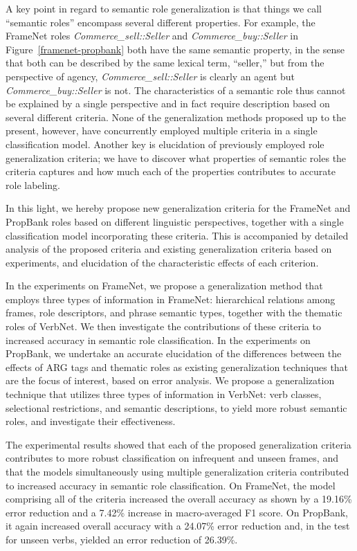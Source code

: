 \documentclass[english]{jnlp_1.4_rep}
\begin{document}
A key point in regard to semantic role generalization is that things we call ``semantic roles'' encompass several different properties. For example, the FrameNet roles {\it Commerce\_sell::Seller} and {\it Commerce\_buy::Seller} in Figure~\ref{framenet-propbank} both have the same semantic property, in the sense that both can be described by the same lexical term, ``seller,'' but from the perspective of agency, {\it Commerce\_sell::Seller} is clearly an agent but {\it Commerce\_buy::Seller} is not. The characteristics of a semantic role thus cannot be explained by a single perspective and in fact require description based on several different criteria. None of the generalization methods proposed up to the present, however, have concurrently employed multiple criteria in a single classification model. Another key is elucidation of previously employed role generalization criteria; we have to discover what properties of semantic roles the criteria captures and how much each of the properties contributes to accurate role labeling.

In this light, we hereby propose new generalization criteria for the FrameNet and PropBank roles based on different linguistic perspectives, together with a single classification model incorporating these criteria. This is accompanied by detailed analysis of the proposed criteria and existing generalization criteria based on experiments, and elucidation of the characteristic effects of each criterion.

In the experiments on FrameNet, we propose a generalization method that employs three types of information in FrameNet: hierarchical relations among frames, role descriptors, and phrase semantic types, together with the thematic roles of VerbNet. We then investigate the contributions of these criteria to increased accuracy in semantic role classification. In the experiments on PropBank, we undertake an accurate elucidation of the differences between the effects of ARG tags and thematic roles as existing generalization techniques that are the focus of interest, based on error analysis. We propose a generalization technique that utilizes three types of information in VerbNet: verb classes, selectional restrictions, and semantic descriptions, to yield more robust semantic roles, and investigate their effectiveness.

The experimental results showed that each of the proposed generalization criteria contributes to more robust classification on infrequent and unseen frames, and that the models simultaneously using multiple generalization criteria contributed to increased accuracy in semantic role classification. On FrameNet, the model comprising all of the criteria increased the overall accuracy as shown by a 19.16\% error reduction and a 7.42\% increase in macro-averaged F1 score. On PropBank, it again increased overall accuracy with a 24.07\% error reduction and, in the test for unseen verbs, yielded an error reduction of 26.39\%.
\end{document}

